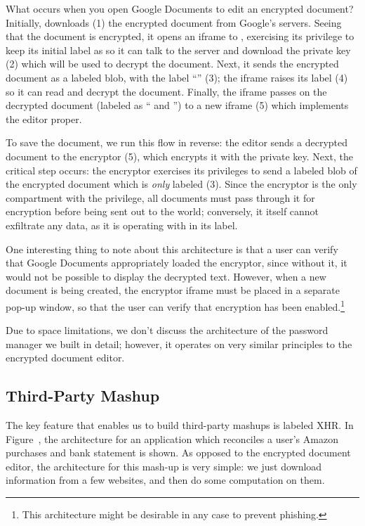 What occurs when you open Google Documents to edit an encrypted
document?
%
Initially,  downloads (1) the encrypted document from
Google's servers.
%
Seeing that the document is encrypted, it opens an iframe to
, exercising its privilege to keep its initial label as
 so it can talk to the  server and
download the private key (2) which will be used to decrypt the document.
%
Next, it sends the encrypted document as a labeled blob, with the label
``'' (3); the iframe raises its label (4) so it can read
and decrypt the document.
%
Finally, the iframe passes on the decrypted document (labeled as
`` and '') to a new iframe (5) which
implements the editor proper.

To save the document, we run this flow in reverse: the editor sends a
decrypted document to the encryptor (5), which encrypts it with the
private key.  Next, the critical step occurs: the encryptor exercises its privileges
to send a labeled blob of the encrypted document which is \emph{only}
labeled  (3).  Since the encryptor is the only compartment
with the  privilege, all documents must pass through it for
encryption before being sent out to the world; conversely, it itself cannot
exfiltrate any data, as it is operating with  in its label.

One interesting thing to note about this architecture is that a user can
verify that Google Documents appropriately loaded the encryptor, since
without it, it would not be possible to display the decrypted text.  However, when
a new document is being created, the encryptor iframe must be placed
in a separate pop-up window, so that the user can verify that encryption
has been enabled.\footnote{This architecture might be desirable in any case
to prevent phishing.}

Due to space limitations, we don't discuss the architecture of the
password manager we built in detail; however, it operates on very
similar principles to the encrypted document editor.

\subsection{Third-Party Mashup}
\label{sec:apps-mashup}

The key feature that enables us to build third-party mashups is
labeled XHR\@.  In Figure~, the architecture for an
application which reconciles a user's Amazon purchases
and bank statement is shown.  As opposed to the encrypted document editor,
the architecture for this mash-up is very simple: we just download
information from a few websites, and then do some computation on them.

